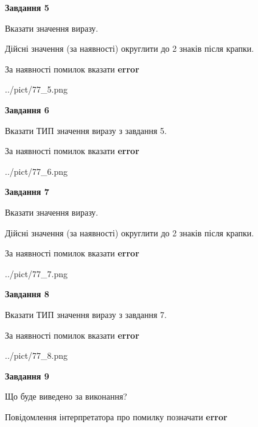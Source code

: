 \documentclass[11pt, ukrainian]{article}
\begin{document}
{\begin {large}
{\begin {center}\textbf{Завдання 5}\end {center}}\par
Вказати значення виразу. \par
Дійсні значення (за наявності) округлити до 2 знаків після крапки. \par
За наявності помилок вказати \textbf{error}

\begin{center}
	{../pict/77_5.png}
\end{center}
\newpage

{\begin {center}\textbf{Завдання 6}\end {center}}\par
Вказати ТИП значення виразу з завдання 5. \par
За наявності помилок вказати \textbf{error}

\begin{center}
	{../pict/77_6.png}
\end{center}
\newpage

{\begin {center}\textbf{Завдання 7}\end {center}}\par
Вказати значення виразу. \par
Дійсні значення (за наявності) округлити до 2 знаків після крапки. \par
За наявності помилок вказати \textbf{error}

\begin{center}
	{../pict/77_7.png}
\end{center}
\newpage

{\begin {center}\textbf{Завдання 8}\end {center}}\par
Вказати ТИП значення виразу з завдання 7. \par
За наявності помилок вказати \textbf{error}

\begin{center}
	{../pict/77_8.png}
\end{center}
\newpage

{\begin {center}\textbf{Завдання 9}\end {center}}\par
Що буде виведено за виконання? \par
Повідомлення інтерпретатора про помилку позначати \textbf{error}


\end{large}}
\end{document}
